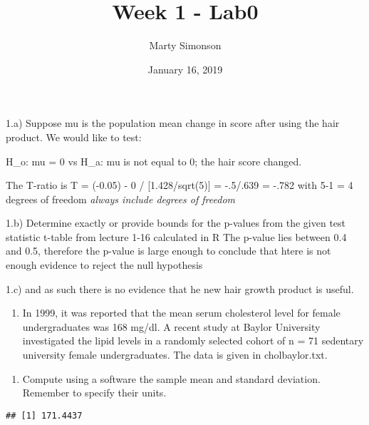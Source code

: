 \documentclass[]{article}
\title{Week 1 - Lab0}
\author{Marty Simonson}
\date{January 16, 2019}
\newenvironment{Shaded}{\begin{snugshade}}{\end{snugshade}}
\newcommand{\KeywordTok}[1]{\textcolor[rgb]{0.13,0.29,0.53}{\textbf{#1}}}
\newcommand{\OperatorTok}[1]{\textcolor[rgb]{0.81,0.36,0.00}{\textbf{#1}}}
\newcommand{\NormalTok}[1]{#1}
\providecommand{\tightlist}{%
  \setlength{\itemsep}{0pt}\setlength{\parskip}{0pt}}
\begin{document}
\maketitle

1.a) Suppose mu is the population mean change in score after using the
hair product. We would like to test:

H\_o: mu = 0 vs H\_a: mu is not equal to 0; the hair score changed.

The T-ratio is T = (-0.05) - 0 / {[}1.428/sqrt(5){]} = -.5/.639 = -.782
with 5-1 = 4 degrees of freedom \emph{always include degrees of freedom}

1.b) Determine exactly or provide bounds for the p-values from the given
test statistic t-table from lecture 1-16 calculated in R The p-value
lies between 0.4 and 0.5, therefore the p-value is large enough to
conclude that htere is not enough evidence to reject the null hypothesis

1.c) and as such there is no evidence that he new hair growth product is
useful.

\begin{enumerate}
\def\labelenumi{\arabic{enumi}.}
\setcounter{enumi}{1}
\tightlist
\item
  In 1999, it was reported that the mean serum cholesterol level for
  female undergraduates was 168 mg/dl. A recent study at Baylor
  University investigated the lipid levels in a randomly selected cohort
  of n = 71 sedentary university female undergraduates. The data is
  given in cholbaylor.txt.
\end{enumerate}

\begin{enumerate}
\def\labelenumi{\alph{enumi})}
\tightlist
\item
  Compute using a software the sample mean and standard deviation.
  Remember to specify their units.
\end{enumerate}

\begin{Shaded}
\end{Shaded}

\begin{verbatim}
## [1] 171.4437
\end{verbatim}

\begin{Shaded}
\end{Shaded}
\end{document}
